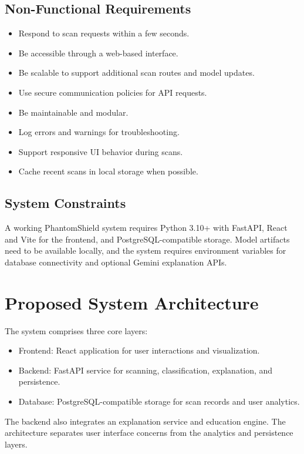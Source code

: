 \documentclass[conference]{IEEEtran}
\begin{document}
\subsection{Non-Functional Requirements}
\begin{itemize}[itemsep=0pt,topsep=0pt]
    \item Respond to scan requests within a few seconds.
    \item Be accessible through a web-based interface.
    \item Be scalable to support additional scan routes and model updates.
    \item Use secure communication policies for API requests.
    \item Be maintainable and modular.
    \item Log errors and warnings for troubleshooting.
    \item Support responsive UI behavior during scans.
    \item Cache recent scans in local storage when possible.
\end{itemize}

\subsection{System Constraints}
A working PhantomShield system requires Python 3.10+ with FastAPI, React and Vite for the frontend, and PostgreSQL-compatible storage. Model artifacts need to be available locally, and the system requires environment variables for database connectivity and optional Gemini explanation APIs.

\section{Proposed System Architecture}
The system comprises three core layers:
\begin{itemize}[itemsep=0pt,topsep=0pt]
    \item Frontend: React application for user interactions and visualization.
    \item Backend: FastAPI service for scanning, classification, explanation, and persistence.
    \item Database: PostgreSQL-compatible storage for scan records and user analytics.
\end{itemize}

The backend also integrates an explanation service and education engine. The architecture separates user interface concerns from the analytics and persistence layers.
\end{document}
